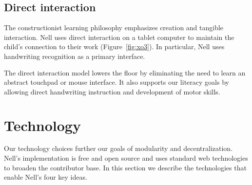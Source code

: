 \documentclass[preprint]{sig-alternate}
\begin{document}
\subsection{Direct interaction}


The constructionist learning philosophy emphasizes creation and
tangible interaction.  Nell uses direct interaction on a tablet
computer to maintain the child's connection to their work
(Figure~\ref{fig:xo3}).  In particular, Nell uses handwriting
recognition as a primary interface.

The direct interaction model lowers the floor by eliminating the need
to learn an abstract touchpad or mouse interface.  It also supports
our literacy goals by allowing direct handwriting instruction and
development of motor skills.

\section{Technology}
Our technology choices further our goals of modularity and
decentralization.  Nell's implementation is free and open source and uses
standard web technologies to broaden the contributor base.  In this
section we describe the technologies that enable Nell's four key ideas.
\end{document}
